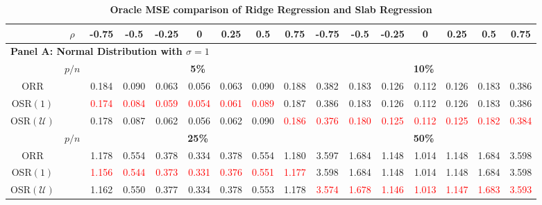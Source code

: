 \begin{table}
\setlength{\tabcolsep}{1pt} %
\renewcommand{\arraystretch}{1.5} %
\caption{\textbf{Oracle MSE comparison of Ridge Regression and Slab Regression}}
\label{tab:oracle_comparison}
\huge
\scriptsize{
\begin{tabular*}{\textwidth}{@{\extracolsep{\fill}}cc|ccccccc|ccccccc@{}}
\hline
\multicolumn{1}{c}{\textbf{}} & \multicolumn{1}{c|}{\textbf{$\rho$}} & \textbf{-0.75} & \textbf{-0.5} & \textbf{-0.25} & \textbf{0} & \textbf{0.25} & \textbf{0.5} & \textbf{0.75} & \textbf{-0.75} & \textbf{-0.5} & \textbf{-0.25} & \textbf{0} & \textbf{0.25} & \textbf{0.5} & \textbf{0.75} \\
\hline
\multicolumn{16}{l}{\textbf{Panel A: Normal Distribution with $\sigma = 1$}} \\
\hline
\multicolumn{1}{c}{\textbf{}} & \multicolumn{1}{c|}{\textbf{$p/n$}} & \multicolumn{7}{c|}{\textbf{5\%}} & \multicolumn{7}{c}{\textbf{10\%}} \\
\hline
ORR &  & 0.184 & 0.090 & 0.063 & 0.056 & 0.063 & 0.090 & 0.188 & 0.382 & 0.183 & 0.126 & 0.112 & 0.126 & 0.183 & 0.386 \\
OSR$(1)$ &  & \textcolor{red}{0.174} & \textcolor{red}{0.084} & \textcolor{red}{0.059} & \textcolor{red}{0.054} & \textcolor{red}{0.061} & \textcolor{red}{0.089} & 0.187 & 0.386 & 0.183 & 0.126 & 0.112 & 0.126 & 0.183 & 0.386 \\
OSR$(\mathcal{U})$ &  & 0.178 & 0.087 & 0.062 & 0.056 & 0.062 & 0.090 & \textcolor{red}{0.186} & \textcolor{red}{0.376} & \textcolor{red}{0.180} & \textcolor{red}{0.125} & \textcolor{red}{0.112} & \textcolor{red}{0.125} & \textcolor{red}{0.182} & \textcolor{red}{0.384} \\
\hline
\multicolumn{1}{c}{\textbf{}} & \multicolumn{1}{c|}{\textbf{$p/n$}} & \multicolumn{7}{c|}{\textbf{25\%}} & \multicolumn{7}{c}{\textbf{50\%}} \\
\hline
ORR &  & 1.178 & 0.554 & 0.378 & 0.334 & 0.378 & 0.554 & 1.180 & 3.597 & 1.684 & 1.148 & 1.014 & 1.148 & 1.684 & 3.598 \\
OSR$(1)$ &  & \textcolor{red}{1.156} & \textcolor{red}{0.544} & \textcolor{red}{0.373} & \textcolor{red}{0.331} & \textcolor{red}{0.376} & \textcolor{red}{0.551} & \textcolor{red}{1.177} & 3.598 & 1.684 & 1.148 & 1.014 & 1.148 & 1.684 & 3.598 \\
OSR$(\mathcal{U})$ &  & 1.162 & 0.550 & 0.377 & 0.334 & 0.378 & 0.553 & 1.178 & \textcolor{red}{3.574} & \textcolor{red}{1.678} & \textcolor{red}{1.146} & \textcolor{red}{1.013} & \textcolor{red}{1.147} & \textcolor{red}{1.683} & \textcolor{red}{3.593} \\

\end{tabular*}}
\end{table}
